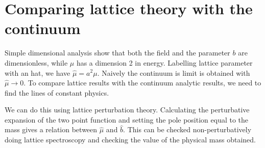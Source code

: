 \documentclass[12pt]{report}
\begin{document}
\chapter{Comparing lattice theory with the continuum }

Simple dimensional analysis show that both the field and the parameter $b$ are dimensionless, while $\mu$ has a dimension 2 in energy. Labelling lattice parameter with an hat, we have $\hat \mu = a^2 \mu$. Naively the continuum is limit is obtained  with $\hat \mu \to 0$. To compare lattice results with the continuum analytic results, we need to find the lines of constant physics.

We can do this using lattice perturbation theory. Calculating the perturbative expansion of the two point function and setting the pole position equal to the mass gives a relation between $ \hat \mu$ and $\hat b$. This can be checked non-perturbatively doing lattice spectroscopy and checking the value of the physical mass obtained.
 

 
\end{document}
